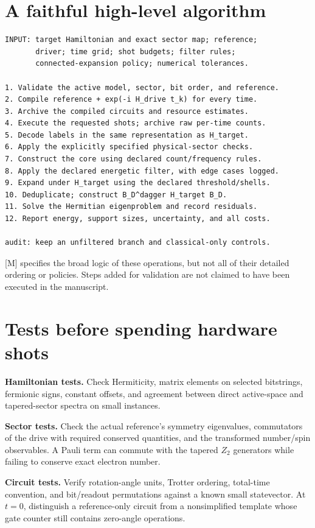 \documentclass[11pt,a4paper,oneside]{report}
\begin{document}
\section{A faithful high-level algorithm}
\begin{lstlisting}
INPUT: target Hamiltonian and exact sector map; reference;
       driver; time grid; shot budgets; filter rules;
       connected-expansion policy; numerical tolerances.

1. Validate the active model, sector, bit order, and reference.
2. Compile reference + exp(-i H_drive t_k) for every time.
3. Archive the compiled circuits and resource estimates.
4. Execute the requested shots; archive raw per-time counts.
5. Decode labels in the same representation as H_target.
6. Apply the explicitly specified physical-sector checks.
7. Construct the core using declared count/frequency rules.
8. Apply the declared energetic filter, with edge cases logged.
9. Expand under H_target using the declared threshold/shells.
10. Deduplicate; construct B_D^dagger H_target B_D.
11. Solve the Hermitian eigenproblem and record residuals.
12. Report energy, support sizes, uncertainty, and all costs.

audit: keep an unfiltered branch and classical-only controls.
\end{lstlisting}
{[M]} specifies the broad logic of these operations, but not all of their detailed ordering or policies. Steps added for validation are not claimed to have been executed in the manuscript.

\section{Tests before spending hardware shots}
\textbf{Hamiltonian tests.} Check Hermiticity, matrix elements on selected bitstrings, fermionic signs, constant offsets, and agreement between direct active-space and tapered-sector spectra on small instances.

\textbf{Sector tests.} Check the actual reference's symmetry eigenvalues, commutators of the drive with required conserved quantities, and the transformed number/spin observables. A Pauli term can commute with the tapered $Z_2$ generators while failing to conserve exact electron number.

\textbf{Circuit tests.} Verify rotation-angle units, Trotter ordering, total-time convention, and bit/readout permutations against a known small statevector. At $t=0$, distinguish a reference-only circuit from a nonsimplified template whose gate counter still contains zero-angle operations.
\end{document}

